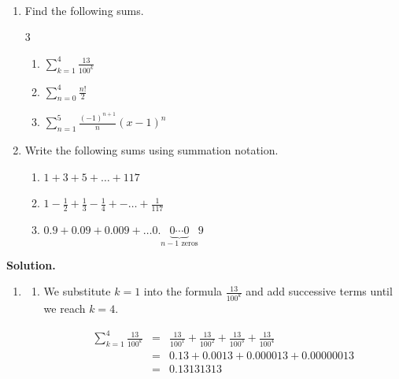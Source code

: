 \documentclass{ximera}
\begin{document}
\begin{example} \label{seriesex1} $~$

\begin{enumerate}

\item  Find the following sums.

\begin{multicols}{3}

\begin{enumerate}

\item  $\displaystyle{\sum_{k=1}^{4} \frac{13}{100^k} }$

\item  $\displaystyle{\sum_{n=0}^{4} \frac{n!}{2}}$

\item  $\displaystyle{\sum_{n=1}^{5} \frac{(-1)^{n+1}}{n} (x-1)^n}$

\end{enumerate}

\end{multicols}

\item  Write the following sums using summation notation.

\begin{enumerate}

\item  $1 + 3 + 5 + \ldots + 117$

\item  $1 - \frac{1}{2} + \frac{1}{3} - \frac{1}{4} + - \ldots + \frac{1}{117}$

\item  $0.9 + 0.09 + 0.009 + \ldots 0.\!  \underbrace{0 \cdots 0}_{\text{$n-1$ zeros}} \! 9$

\end{enumerate}

\end{enumerate}

{ \bf Solution.}

\begin{enumerate}

\item \begin{enumerate} \item We substitute $k=1$ into the formula $\frac{13}{100^k}$ and add successive terms until we reach $k=4.$

\[ \begin{array}{rcl}

\displaystyle{\sum_{k=1}^{4} \frac{13}{100^k} } & = & \frac{13}{100^1} + \frac{13}{100^2} + \frac{13}{100^3} + \frac{13}{100^4} \\ 
																								& = & 0.13 + 0.0013 + 0.000013 + 0.00000013 \\
																								& = & 0.13131313 \\
\end{array}\]


\end{enumerate}
\end{enumerate}
\end{example}
\end{document}
